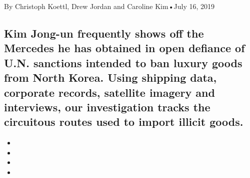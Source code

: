 By Christoph Koettl, Drew Jordan and Caroline Kim•July 16, 2019

\hypertarget{kim-jong-un-frequently-shows-off-the-mercedes-he-has-obtained-in-open-defiance-of-un-sanctions-intended-to-ban-luxury-goods-from-north-korea-using-shipping-data-corporate-records-satellite-imagery-and-interviews-our-investigation-tracks-the-circuitous-routes-used-to-import-illicit-goods-1}{%
\subsection{Kim Jong-un frequently shows off the Mercedes he has
obtained in open defiance of U.N. sanctions intended to ban luxury goods
from North Korea. Using shipping data, corporate records, satellite
imagery and interviews, our investigation tracks the circuitous routes
used to import illicit
goods.}\label{kim-jong-un-frequently-shows-off-the-mercedes-he-has-obtained-in-open-defiance-of-un-sanctions-intended-to-ban-luxury-goods-from-north-korea-using-shipping-data-corporate-records-satellite-imagery-and-interviews-our-investigation-tracks-the-circuitous-routes-used-to-import-illicit-goods-1}}

\begin{itemize}
\item
\item
\item
\item
\end{itemize}

